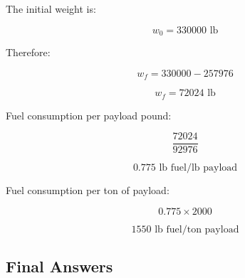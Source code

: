 \documentclass{KPS_assignment}
\begin{document}
The initial weight is:

\[
w_0=330000 \text{ lb}
\]

Therefore:

\[
w_f=330000-257976
\]

\[
\boxed{
w_f=72024 \text{ lb}
}
\]

Fuel consumption per payload pound:

\[
\frac{72024}{92976}
\]

\[
\boxed{
0.775 \text{ lb fuel/lb payload}
}
\]

Fuel consumption per ton of payload:

\[
0.775\times2000
\]

\[
\boxed{
1550 \text{ lb fuel/ton payload}
}
\]


\subsection{Final Answers}
\end{document}
